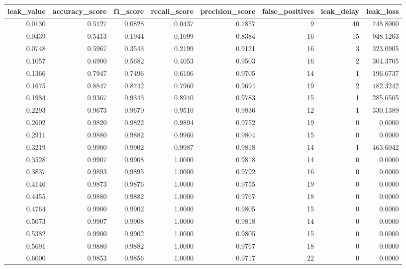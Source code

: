 \begin{tabular}{rrrrrrrr}
\toprule
leak\_value & accuracy\_score & f1\_score & recall\_score & precision\_score & false\_positives & leak\_delay & leak\_loss \\
\midrule
0.0130 & 0.5127 & 0.0828 & 0.0437 & 0.7857 & 9 & 40 & 748.8000 \\
0.0439 & 0.5413 & 0.1944 & 0.1099 & 0.8384 & 16 & 15 & 948.1263 \\
0.0748 & 0.5967 & 0.3543 & 0.2199 & 0.9121 & 16 & 3 & 323.0905 \\
0.1057 & 0.6900 & 0.5682 & 0.4053 & 0.9503 & 16 & 2 & 304.3705 \\
0.1366 & 0.7947 & 0.7496 & 0.6106 & 0.9705 & 14 & 1 & 196.6737 \\
0.1675 & 0.8847 & 0.8742 & 0.7960 & 0.9694 & 19 & 2 & 482.3242 \\
0.1984 & 0.9367 & 0.9343 & 0.8940 & 0.9783 & 15 & 1 & 285.6505 \\
0.2293 & 0.9673 & 0.9670 & 0.9510 & 0.9836 & 12 & 1 & 330.1389 \\
0.2602 & 0.9820 & 0.9822 & 0.9894 & 0.9752 & 19 & 0 & 0.0000 \\
0.2911 & 0.9880 & 0.9882 & 0.9960 & 0.9804 & 15 & 0 & 0.0000 \\
0.3219 & 0.9900 & 0.9902 & 0.9987 & 0.9818 & 14 & 1 & 463.6042 \\
0.3528 & 0.9907 & 0.9908 & 1.0000 & 0.9818 & 14 & 0 & 0.0000 \\
0.3837 & 0.9893 & 0.9895 & 1.0000 & 0.9792 & 16 & 0 & 0.0000 \\
0.4146 & 0.9873 & 0.9876 & 1.0000 & 0.9755 & 19 & 0 & 0.0000 \\
0.4455 & 0.9880 & 0.9882 & 1.0000 & 0.9767 & 18 & 0 & 0.0000 \\
0.4764 & 0.9900 & 0.9902 & 1.0000 & 0.9805 & 15 & 0 & 0.0000 \\
0.5073 & 0.9907 & 0.9908 & 1.0000 & 0.9818 & 14 & 0 & 0.0000 \\
0.5382 & 0.9900 & 0.9902 & 1.0000 & 0.9805 & 15 & 0 & 0.0000 \\
0.5691 & 0.9880 & 0.9882 & 1.0000 & 0.9767 & 18 & 0 & 0.0000 \\
0.6000 & 0.9853 & 0.9856 & 1.0000 & 0.9717 & 22 & 0 & 0.0000 \\
\bottomrule
\end{tabular}
